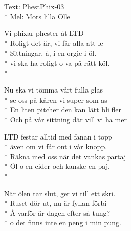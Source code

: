 \begin{SongText}
    \begin{SongInfo}
        Text: PhestPhix-03\\*%
        Mel: Mors lilla Olle
    \end{SongInfo}
    \begin{SongVerse}
        Vi phixar phester åt LTD\\*%
        Roligt det är, vi får alla att le\\*%
        Sittningar, å, i en orgie i öl.\\*%
        vi ska ha roligt o va på rätt köl.\\*%
    \end{SongVerse}
    \begin{SongVerse}
        Nu ska vi tömma vårt fulla glas\\*%
        se oss på kåren vi super som as\\*%
        En liten pitcher den kan lätt bli fler\\*%
        Och på vår sittning där vill vi ha mer
    \end{SongVerse}
    \begin{SongVerse}
        LTD festar alltid med fanan i topp\\*%
        även om vi får ont i vår knopp.\\*%
        Räkna med oss när det vankas partaj\\*%
        Öl o en cider och kanske en paj.\\*%
    \end{SongVerse}
    \begin{SongVerse}
        När ölen tar slut, ger vi till ett skri.\\*%
        Ruset dör ut, nu är fyllan förbi\\*%
        Å varför är dagen efter så tung?\\*%
        o det finns inte en peng i min pung.
    \end{SongVerse}
\end{SongText}
